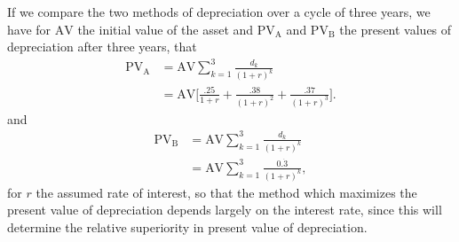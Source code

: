 If we compare the two methods of depreciation over a cycle of three years, we have
for $\text{AV}$ the initial value of the asset and $\text{PV}_{\text{A}}$ and
$\text{PV}_{\text{B}}$ the present values of depreciation after three years, that
\begin{equation*}
    \begin{split}
        \text{PV}_{\text{A}} &= \text{AV} \sum_{k=1}^3{\frac{d_k}{({1 + r})^k}} \\
                             &= \text{AV} \Biggl[\frac{.25}{1 + r} 
                                 + \frac{.38}{{(1 + r)}^2} 
                                 + \frac{.37}{{(1 + r)}^3}\Biggr].
    \end{split}
\end{equation*}
and
\begin{equation*}
    \begin{split}
        \text{PV}_{\text{B}} &= \text{AV} \sum_{k=1}^3{\frac{d_k}{({1 + r})^k}} \\
                             &= \text{AV} \sum_{k=1}^3{\frac{0.\dot{3}}{({1 + r})^k}},
    \end{split}
\end{equation*}
for $r$ the assumed rate of interest, so that the method which maximizes the 
present value of depreciation depends largely on the interest rate, since
this will determine the relative superiority in present value of depreciation.
